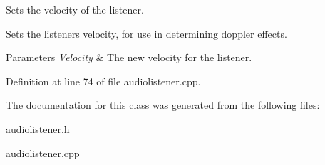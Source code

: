 Sets the velocity of the listener. 

Sets the listeners velocity, for use in determining doppler effects. 
\begin{DoxyParams}{Parameters}
{\em Velocity} & The new velocity for the listener. \\
\hline
\end{DoxyParams}


Definition at line 74 of file audiolistener.cpp.



The documentation for this class was generated from the following files:\begin{DoxyCompactItemize}
\item 
audiolistener.h\item 
audiolistener.cpp\end{DoxyCompactItemize}
